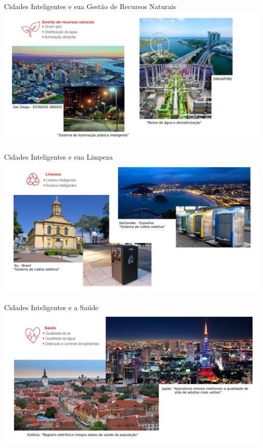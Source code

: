 \documentclass{beamer}
\begin{document}
\begin{frame}{Cidades Inteligentes e sua Gestão de Recursos Naturais}
\includegraphics[width=1.1\textwidth]{img/reto__4.jpeg}  

\end{frame}



\begin{frame}{Cidades Inteligentes e sua Limpeza}
\includegraphics[width=1\textwidth]{img/reto__5.jpeg}  
\end{frame}

\begin{frame}{Cidades Inteligentes e a Saúde}
\includegraphics[width=1\textwidth]{img/reto__6.jpeg}  
\end{frame}
\end{document}
